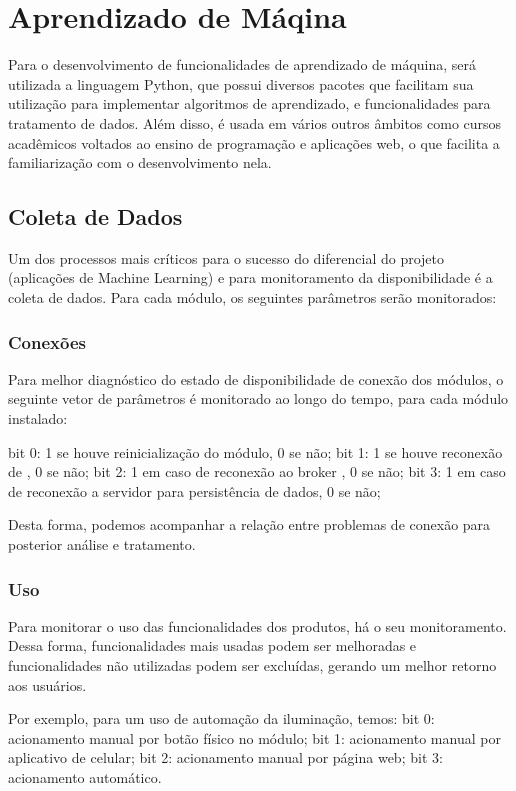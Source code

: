 \chapter{Aprendizado de Máqina}

Para o desenvolvimento de funcionalidades de aprendizado de máquina, será utilizada a linguagem Python, que possui diversos pacotes que facilitam sua utilização para implementar algoritmos de aprendizado, e funcionalidades para tratamento de dados. Além disso, é usada em vários outros âmbitos como cursos acadêmicos voltados ao ensino de programação e aplicações web, o que facilita a familiarização com o desenvolvimento nela.

\section{Coleta de Dados}
Um dos processos mais críticos para o sucesso do diferencial do projeto (aplicações de Machine Learning) e para monitoramento da disponibilidade é a coleta de dados. Para cada módulo, os seguintes parâmetros serão monitorados:

\subsection{Conexões}
Para melhor diagnóstico do estado de disponibilidade de conexão dos módulos, o seguinte vetor de parâmetros é monitorado ao longo do tempo, para cada módulo instalado:

bit 0: 1 se houve reinicialização do módulo, 0 se não;
bit 1: 1 se houve reconexão de \wwifi, 0 se não;
bit 2: 1 em caso de reconexão ao broker \wmqtt, 0 se não;
bit 3: 1 em caso de reconexão a servidor para persistência de dados, 0 se não;

Desta forma, podemos acompanhar a relação entre problemas de conexão para posterior análise e tratamento.

\subsection{Uso}
Para monitorar o uso das funcionalidades dos produtos, há o seu monitoramento. Dessa forma, funcionalidades mais usadas podem ser melhoradas e funcionalidades não utilizadas podem ser excluídas, gerando um melhor retorno aos usuários.

	Por exemplo, para um uso de automação da iluminação, temos:
bit 0: acionamento manual por botão físico no módulo;
bit 1: acionamento manual por aplicativo de celular;
bit 2: acionamento manual por página web;
bit 3: acionamento automático.
